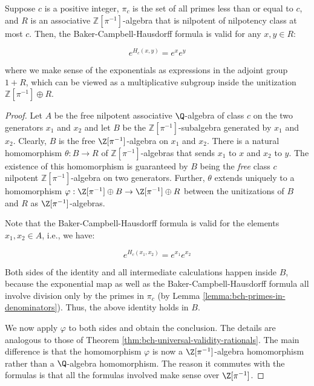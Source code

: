 \documentclass{ucetd}
\begin{document}
\begin{theorem}\label{thm:bch-universal-validity-pi-powered}
  Suppose $c$ is a positive integer, $\pi_c$ is the set of all primes
  less than or equal to $c$, and $R$ is an associative
  $\mathbb{Z}[\pi^{-1}]$-algebra that is nilpotent of nilpotency class
  at most $c$. Then, the Baker-Campbell-Hausdorff formula is valid
  for any $x,y \in R$:
    
  $$e^{H_c(x,y)} = e^xe^y$$
    
  where we make sense of the exponentials as expressions in the
  adjoint group $1 + R$, which can be viewed as a multiplicative
  subgroup inside the unitization $\mathbb{Z}[\pi^{-1}] \oplus R$.
\end{theorem}

\begin{proof}
  Let $A$ be the free nilpotent associative $\Q$-algebra of class $c$
  on the two generators $x_1$ and $x_2$ and let $B$ be the
  $\mathbb{Z}[\pi^{-1}]$-subalgebra generated by $x_1$ and
  $x_2$. Clearly, $B$ is the free $\Z[\pi^{-1}]$-algebra on $x_1$ and
  $x_2$. There is a natural homomorphism $\theta: B \to R$ of
  $\mathbb{Z}[\pi^{-1}]$-algebras that sends $x_1$ to $x$ and $x_2$ to
  $y$. The existence of this homomorphism is guaranteed by $B$ being
  the {\em free} class $c$ nilpotent $\mathbb{Z}[\pi^{-1}]$-algebra on
  two generators. Further, $\theta$ extends uniquely to a homomorphism
  $\varphi: \Z[\pi^{-1}] \oplus B \to \Z[\pi^{-1}] \oplus R$ between
  the unitizations of $B$ and $R$ as $\Z[\pi^{-1}]$-algebras.

  Note that the Baker-Campbell-Hausdorff formula is valid for the
  elements $x_1,x_2 \in A$, i.e., we have:

  $$e^{H_c(x_1,x_2)} = e^{x_1}e^{x_2}$$

  Both sides of the identity and all intermediate calculations happen
  inside $B$, because the exponential map as well as the
  Baker-Campbell-Hausdorff formula all involve division only by the
  primes in $\pi_c$ (by Lemma
  \ref{lemma:bch-primes-in-denominators}). Thus, the above identity
  holds in $B$.

  We now apply $\varphi$ to both sides and obtain the conclusion. The
  details are analogous to those of Theorem
  \ref{thm:bch-universal-validity-rationals}. The main difference is
  that the homomorphism $\varphi$ is now a $\Z[\pi^{-1}]$-algebra
  homomorphism rather than a $\Q$-algebra homomorphism. The reason it
  commutes with the formulas is that all the formulas involved make
  sense over $\Z[\pi^{-1}]$.
\end{proof}
\end{document}
